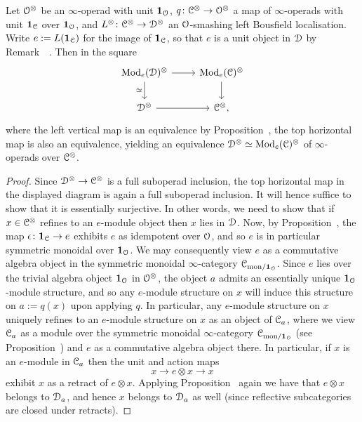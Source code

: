 \begin{corollary}
\label{corollary:action-smashing}%
Let $\mathcal{O}^{\otimes}$ be an $\infty$-operad with unit $\mathbf{1}_{\mathcal{O}}$, $q\colon \mathcal C^{\otimes} \to \mathcal{O}^{\otimes}$ a map of $\infty$-operads with unit $\mathbf{1}_{\mathcal C}$ over $\mathbf{1}_{\mathcal{O}}$, and $L^{\otimes} \colon \mathcal C^{\otimes} \to \mathcal{D}^{\otimes}$ an $\mathcal{O}$-smashing left Bousfield localisation. 
Write $e := L(\mathbf{1}_{\mathcal C})$ for the image of $\mathbf{1}_{\mathcal C}$, so that $e$ is a unit object in $\mathcal{D}$ by Remark~~.
Then in the square
\[
\begin{tikzcd}
\Mod_e(\D)^{\otimes} \ar[r]\ar[d,"\simeq"'] & \Mod_e(\C)^{\otimes} \ar[d]\\
\D^{\otimes} \ar[r] & \C^{\otimes},
\end{tikzcd}
\]
where the left vertical map is an equivalence by Proposition~,
the top horizontal map is also an equivalence, yielding an equivalence $\mathcal{D}^{\otimes} \simeq \operatorname{Mod}_e(\mathcal C)^{\otimes}$ of $\infty$-operads over $\mathcal C^{\otimes}$.
\end{corollary}
\begin{proof}
Since $\mathcal{D}^{\otimes} \to \mathcal C^{\otimes}$ is a full suboperad inclusion, the top horizontal map in the displayed diagram is again a full suboperad inclusion. It will hence suffice to show that it is essentially surjective. In other words, we need to show that if $x \in \mathcal C^{\otimes}$ refines to an $e$-module object then $x$ lies in $\mathcal{D}$. Now, by Proposition~, the map $\epsilon\colon \mathbf{1}_{\mathcal C} \to e$ exhibits $e$ as idempotent over $\mathcal{O}$, and so $e$ is in particular symmetric monoidal over $\mathbf{1}_{\mathcal{O}}$.
We may consequently view $e$ as a commutative algebra object in the symmetric monoidal $\infty$-category $\mathcal C_{\mathrm{mon}/\mathbf{1}_{\mathcal{O}}}$. 
Since $e$ lies over the trivial algebra object $\mathbf{1}_{\mathcal{O}}$ in $\mathcal{O}^{\otimes}$, the object $a$ admits an essentially unique $\mathbf{1}_{\mathcal{O}}$-module structure, and so any $e$-module structure on $x$ will induce this structure on $a := q(x)$ upon applying $q$. 
In particular, any $e$-module structure on $x$ uniquely refines to an $e$-module structure on $x$ as an object of $\mathcal C_a$, where we view $\mathcal C_a$ as a module over the symmetric monoidal $\infty$-category $\mathcal C_{\mathrm{mon}/\mathbf{1}_{\mathcal{O}}}$ (see Proposition~) and $e$ as a commutative algebra object there. In particular, if $x$ is an $e$-module in $\mathcal C_a$ then the unit and action maps
\[
x \to e \otimes x \to x
\]
exhibit $x$ as a retract of $e \otimes x$. Applying Proposition~ again we have that $e \otimes x$ belongs to $\mathcal{D}_a$, and hence $x$ belongs to $\mathcal{D}_a$ as well (since reflective subcategories are closed under retracts).  
\end{proof}


